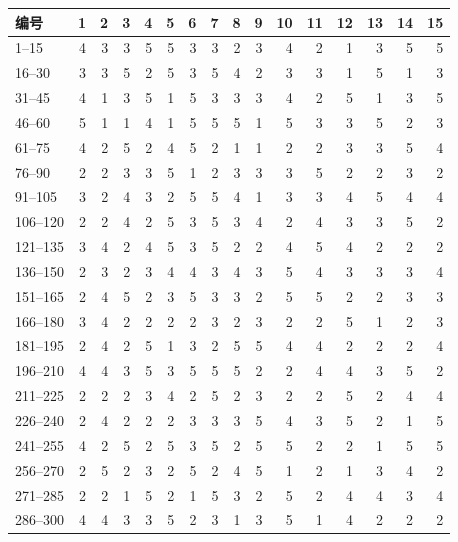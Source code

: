 \par\addvspace{5pt}\begin{center}\begin{minipage}{\linewidth}\centering
\small
{}
\begin{tabular}{lrrrrrrrrrrrrrrr}\toprule
{\bfseries 编号 }&{\bfseries  1 }&{\bfseries  2 }&{\bfseries  3 }&{\bfseries  4 }&{\bfseries  5 }&{\bfseries  6 }&{\bfseries  7 }&{\bfseries  8 }&{\bfseries  9 }&{\bfseries  10 }&{\bfseries  11 }&{\bfseries  12 }&{\bfseries  13 }&{\bfseries  14 }&{\bfseries  15}\\\midrule
1--15 & 4 & 3 & 3 & 5 & 5 & 3 & 3 & 2 & 3 & 4 & 2 & 1 & 3 & 5 & 5\\
16--30 & 3 & 3 & 5 & 2 & 5 & 3 & 5 & 4 & 2 & 3 & 3 & 1 & 5 & 1 & 3\\
31--45 & 4 & 1 & 3 & 5 & 1 & 5 & 3 & 3 & 3 & 4 & 2 & 5 & 1 & 3 & 5\\
46--60 & 5 & 1 & 1 & 4 & 1 & 5 & 5 & 5 & 1 & 5 & 3 & 3 & 5 & 2 & 3\\
61--75 & 4 & 2 & 5 & 2 & 4 & 5 & 2 & 1 & 1 & 2 & 2 & 3 & 3 & 5 & 4\\
76--90 & 2 & 2 & 3 & 3 & 5 & 1 & 2 & 3 & 3 & 3 & 5 & 2 & 2 & 3 & 2\\
91--105 & 3 & 2 & 4 & 3 & 2 & 5 & 5 & 4 & 1 & 3 & 3 & 4 & 5 & 4 & 4\\
106--120 & 2 & 2 & 4 & 2 & 5 & 3 & 5 & 3 & 4 & 2 & 4 & 3 & 3 & 5 & 2\\
121--135 & 3 & 4 & 2 & 4 & 5 & 3 & 5 & 2 & 2 & 4 & 5 & 4 & 2 & 2 & 2\\
136--150 & 2 & 3 & 2 & 3 & 4 & 4 & 3 & 4 & 3 & 5 & 4 & 3 & 3 & 3 & 4\\
151--165 & 2 & 4 & 5 & 2 & 3 & 5 & 3 & 3 & 2 & 5 & 5 & 2 & 2 & 3 & 3\\
166--180 & 3 & 4 & 2 & 2 & 2 & 2 & 3 & 2 & 3 & 2 & 2 & 5 & 1 & 2 & 3\\
181--195 & 2 & 4 & 2 & 5 & 1 & 3 & 2 & 5 & 5 & 4 & 4 & 2 & 2 & 2 & 4\\
196--210 & 4 & 4 & 3 & 5 & 3 & 5 & 5 & 5 & 2 & 2 & 4 & 4 & 3 & 5 & 2\\
211--225 & 2 & 2 & 2 & 3 & 4 & 2 & 5 & 2 & 3 & 2 & 2 & 5 & 2 & 4 & 4\\
226--240 & 2 & 4 & 2 & 2 & 2 & 3 & 3 & 3 & 5 & 4 & 3 & 5 & 2 & 1 & 5\\
241--255 & 4 & 2 & 5 & 2 & 5 & 3 & 5 & 2 & 5 & 5 & 2 & 2 & 1 & 5 & 5\\
256--270 & 2 & 5 & 2 & 3 & 2 & 5 & 2 & 4 & 5 & 1 & 2 & 1 & 3 & 4 & 2\\
271--285 & 2 & 2 & 1 & 5 & 2 & 1 & 5 & 3 & 2 & 5 & 2 & 4 & 4 & 3 & 4\\
286--300 & 4 & 4 & 3 & 3 & 5 & 2 & 3 & 1 & 3 & 5 & 1 & 4 & 2 & 2 & 2\\
\bottomrule\end{tabular}
\end{minipage}\end{center}

